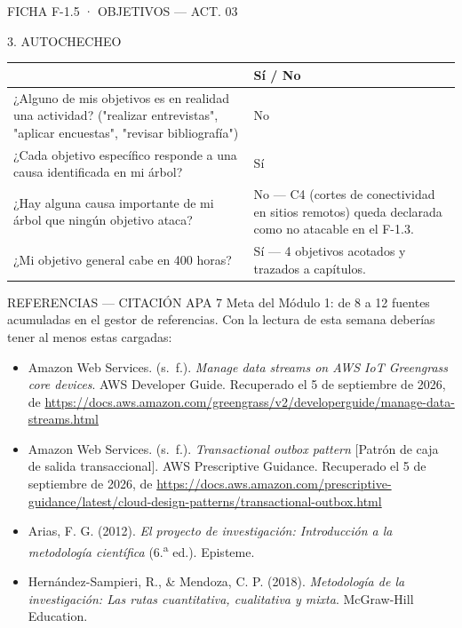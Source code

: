 \documentclass[11pt,a4paper]{article}
\newcommand{\tblhead}{\rowcolor{gris800}}
\begin{document}
\begin{seccion}{\faBullseye}{FICHA F-1.5 · OBJETIVOS --- ACT. 03}
\begin{seccion}{\faCheckCircle}{3. AUTOCHECHEO}
\renewcommand{\arraystretch}{1.3}
\begin{tabularx}{\linewidth}{>{\raggedright\arraybackslash}X p{2.2cm}}
  \toprule
  \tblhead {\color{white}\bfseries Verificación} & {\color{white}\bfseries Sí / No} \\
  \midrule
  ¿Alguno de mis objetivos es en realidad una actividad? ("realizar entrevistas", "aplicar encuestas", "revisar bibliografía") & No \\
  ¿Cada objetivo específico responde a una causa identificada en mi árbol? & Sí \\
  ¿Hay alguna causa importante de mi árbol que ningún objetivo ataca? & No --- C4 (cortes de conectividad en sitios remotos) queda declarada como no atacable en el F-1.3. \\
  ¿Mi objetivo general cabe en 400 horas? & Sí --- 4 objetivos acotados y trazados a capítulos. \\
  \bottomrule
\end{tabularx}
\end{seccion}
\end{seccion}

\begin{seccion}{\faBook}{REFERENCIAS --- CITACIÓN APA 7}
{\small
Meta del Módulo 1: de 8 a 12 fuentes acumuladas en el gestor de referencias. Con la lectura de esta semana deberías tener al menos estas cargadas:
}
\vspace{4pt}
\begin{itemize}
  \item Amazon Web Services. (s.~f.). \emph{Manage data streams on AWS IoT Greengrass core devices}. AWS Developer Guide. Recuperado el 5 de septiembre de 2026, de \url{https://docs.aws.amazon.com/greengrass/v2/developerguide/manage-data-streams.html}
  \item Amazon Web Services. (s.~f.). \emph{Transactional outbox pattern} [Patrón de caja de salida transaccional]. AWS Prescriptive Guidance. Recuperado el 5 de septiembre de 2026, de \url{https://docs.aws.amazon.com/prescriptive-guidance/latest/cloud-design-patterns/transactional-outbox.html}
  \item Arias, F. G. (2012). \emph{El proyecto de investigación: Introducción a la metodología científica} (6.\textsuperscript{a} ed.). Episteme.
  \item Hernández-Sampieri, R., \& Mendoza, C. P. (2018). \emph{Metodología de la investigación: Las rutas cuantitativa, cualitativa y mixta}. McGraw-Hill Education.
\end{itemize}
\end{seccion}
\end{document}
